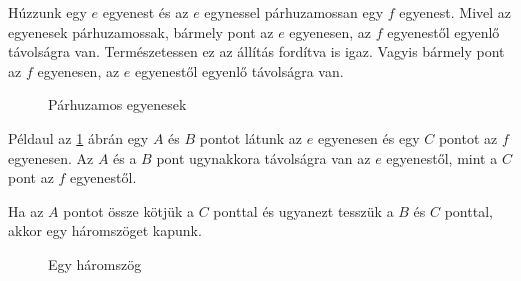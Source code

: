 \documentclass[11pt, a4paper]{article}
\begin{document}
H\'uzzunk egy $e$ egyenest \'es az $e$ egynessel p\'arhuzamossan egy $f$ egyenest. Mivel az egyenesek p\'arhuzamossak, b\'armely pont az $e$ egyenesen, az $f$ egyenest\H{o}l egyenl\H{o} t\'avols\'agra van. Term\'eszetessen ez az \'all\'it\'as ford\'itva is igaz. Vagyis b\'armely pont az $f$ egyenesen, az $e$ egyenest\H{o}l egyenl\H{o} t\'avols\'agra van.

\begin{figure}[h]
\centering
{}
\caption{P\'arhuzamos egyenesek}
\label{fig:paralel}
\end{figure}
P\'eldaul az \ref{fig:paralel} \'abr\'an egy $A$ \'es $B$ pontot l\'atunk az $e$ egyenesen \'es egy $C$ pontot az $f$ egyenesen. Az $A$ \'es a $B$ pont ugynakkora t\'avols\'agra van az $e$ egyenest\H{o}l, mint a $C$ pont az $f$ egyenest\H{o}l.

Ha az $A$ pontot össze kötjük a $C$ ponttal \'es ugyanezt tesszük a $B$ \'es $C$ ponttal, akkor egy h\'aromszöget kapunk.

\begin{figure}[h]
\centering
{}
\caption{Egy h\'aromszög}
\label{fig:tri1}
\end{figure}
\end{document}
